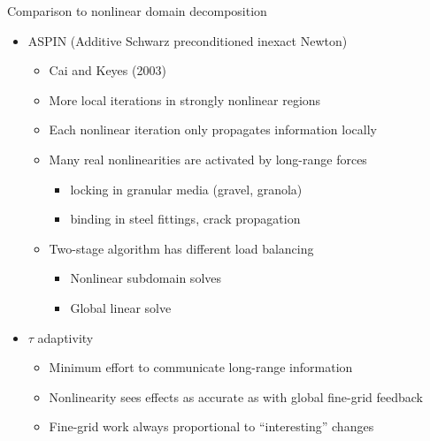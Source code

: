 \documentclass{beamer}
\begin{document}
\begin{frame}{Comparison to nonlinear domain decomposition}
  \begin{itemize}
  \item ASPIN (Additive Schwarz preconditioned inexact Newton) \\
    \begin{itemize}
    \item Cai and Keyes (2003)
    \item More local iterations in strongly nonlinear regions
    \item Each nonlinear iteration only propagates information locally
    \item Many real nonlinearities are activated by long-range forces
      \begin{itemize}
      \item locking in granular media (gravel, granola)
      \item binding in steel fittings, crack propagation
      \end{itemize}
    \item Two-stage algorithm has different load balancing
      \begin{itemize}
      \item Nonlinear subdomain solves
      \item Global linear solve
      \end{itemize}
    \end{itemize}
  \item $\tau$ adaptivity
    \begin{itemize}
    \item Minimum effort to communicate long-range information
    \item Nonlinearity sees effects as accurate as with global fine-grid feedback
    \item Fine-grid work always proportional to ``interesting'' changes
    \end{itemize}
  \end{itemize}
\end{frame}
\end{document}
